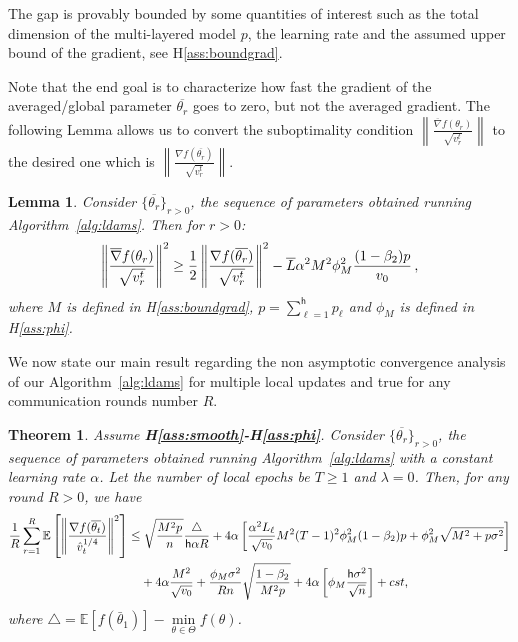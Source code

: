 \documentclass[11pt]{article}
\newtheorem{Lemma}{Lemma}
\newtheorem{Theorem}{Theorem}
\newcommand{\beq}{\begin{equation}}
\newcommand{\eeq}{\end{equation}}
\def\EE{\mathbb{E}}
\def\tot{\mathsf{h}}
\begin{document}
The gap is provably bounded by some quantities of interest such as the total dimension of the multi-layered model $p$, the learning rate and the assumed upper bound of the  gradient, see H\ref{ass:boundgrad}.

Note that the end goal is to characterize how fast the gradient of the averaged/global parameter $\overline{\theta_r}$ goes to zero, but not the averaged gradient. The following Lemma allows us to convert the suboptimality condition $\left\| \frac{\overline{\nabla}f(\theta_r)}{\sqrt{ v_r^t}} \right\|$ to the desired one which is $\left\| \frac{\nabla f(\overline{\theta_r})}{\sqrt{ v_r^t}} \right\|$.


\begin{Lemma}\label{lemma:ratio}
Consider $\{\overline{\theta_r}\}_{r>0}$, the sequence of parameters obtained running Algorithm~\ref{alg:ldams}. Then for $r > 0$:
\beq\notag
\left\| \frac{\overline{\nabla}f(\theta_r)}{\sqrt{ v_r^t}} \right\|^2 \geq \frac{1}{2} \left\| \frac{\nabla f(\overline{\theta_r})}{\sqrt{ v_r^t}} \right\|^2 - \overline{L} \alpha^2 M^2 \phi_M^2 \frac{(1-\beta_2)p}{v_0}\, ,
\eeq
where $M$ is defined in H\ref{ass:boundgrad}, $p = \sum_{\ell = 1}^\tot p_\ell$ and $\phi_M$ is defined in H\ref{ass:phi}.
\end{Lemma}


We now state our main result regarding the non asymptotic convergence analysis of our Algorithm~\ref{alg:ldams} for multiple local updates and true for any communication rounds number $R$.



\begin{Theorem}\label{th:multiple update}
Assume \textbf{H\ref{ass:smooth}-H\ref{ass:phi}}. Consider $\{\overline{\theta_r}\}_{r>0}$, the sequence of parameters obtained running Algorithm~\ref{alg:ldams} with a constant learning rate $\alpha$. Let the number of local epochs be $T \geq 1$ and $\lambda = 0$. Then, for any round $R > 0$, we have
\beq \label{bound1multiple}
\begin{split}
&  \frac{1}{R}\sum_{r=1}^R  \EE\left[ \left\| \frac{\nabla f(\overline{\theta_t})}{\hat v_t^{1/4}}   \right \|^2 \right] \leq    \sqrt{\frac{M^2 p}{n}}  \frac{ \triangle}{\tot \alpha R}+4\alpha \left[ \frac{\alpha^2 L_\ell}{\sqrt{v_0}} M^2 (T-1)^2 \phi_M^2 (1-\beta_2)p +\phi_M^2\sqrt{M^2+p\sigma^2} \right]  \\
&\hspace{1.5in} +4\alpha \frac{M^2}{\sqrt{v_0}} +      \frac{\phi_M   \sigma^2}{R n} \sqrt{\frac{1 - \beta_2}{M^2 p}  } +4\alpha \left[\phi_M \frac{\tot \sigma^2}{\sqrt{n}}\right]   + cst,
  \end{split}
\eeq
where $\triangle=\EE[f(\bar{\theta}_1)]  - \min \limits_{\theta \in \Theta} f(\theta)$.
\end{Theorem}
\end{document}
